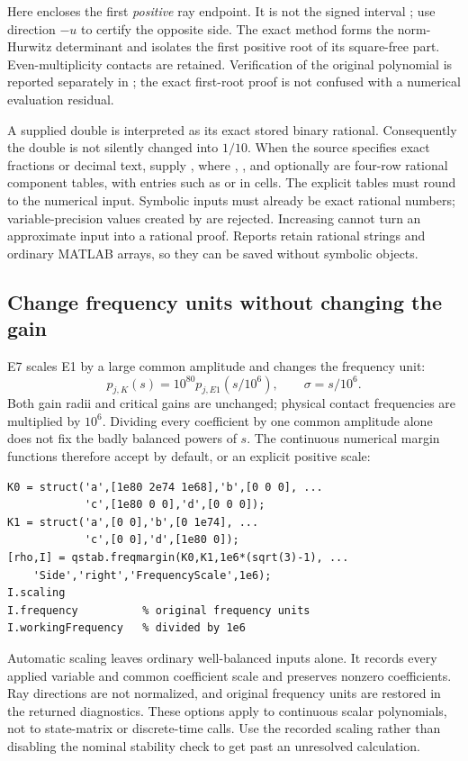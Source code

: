 Here  encloses the first \emph{positive} ray endpoint.
It is not the signed interval ; use direction $-u$ to certify the
opposite side. The exact method forms the norm-Hurwitz determinant and
isolates the first positive root of its square-free part. Even-multiplicity
contacts are retained. Verification of the original polynomial is reported
separately in ; the exact first-root proof is not confused with
a numerical evaluation residual.

A supplied double is interpreted as its exact stored binary rational.
Consequently the double  is not silently changed into $1/10$.
When the source specifies exact fractions or decimal text, supply
, where , , and optionally
 are four-row rational component tables, with entries such
as  or  in cells. The explicit tables must round to
the numerical input. Symbolic inputs must already be exact rational numbers;
variable-precision values created by  are rejected. Increasing
 cannot turn an approximate input into a rational proof.
Reports retain rational strings and ordinary MATLAB arrays, so they can
be saved without symbolic objects.

\subsection{Change frequency units without changing the gain}
E7 scales E1 by a large common amplitude and changes the frequency unit:
\[
 p_{j,K}(s)=10^{80}p_{j,E1}(s/10^6),\qquad
 \sigma=s/10^6.
\]
Both gain radii and critical gains are unchanged; physical contact
frequencies are multiplied by $10^6$. Dividing every coefficient by one
common amplitude alone does not fix the badly balanced powers of $s$.
The continuous numerical margin functions therefore accept
 by default, or an explicit positive scale:
\begin{lstlisting}
K0 = struct('a',[1e80 2e74 1e68],'b',[0 0 0], ...
            'c',[1e80 0 0],'d',[0 0 0]);
K1 = struct('a',[0 0],'b',[0 1e74], ...
            'c',[0 0],'d',[1e80 0]);
[rho,I] = qstab.freqmargin(K0,K1,1e6*(sqrt(3)-1), ...
    'Side','right','FrequencyScale',1e6);
I.scaling
I.frequency          % original frequency units
I.workingFrequency   % divided by 1e6
\end{lstlisting}
Automatic scaling leaves ordinary well-balanced inputs alone. It records
every applied variable and common coefficient scale and preserves nonzero
coefficients. Ray directions are not normalized, and original frequency
units are restored in the returned diagnostics. These options apply to
continuous scalar polynomials, not to state-matrix or discrete-time calls.
Use the recorded scaling rather than disabling the nominal stability check
to get past an unresolved calculation.

